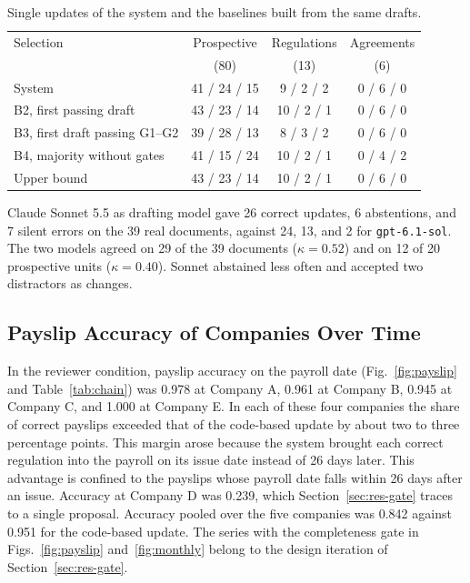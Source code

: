 \begin{table}[!t]
\caption{Single updates of the system and the baselines built from the same drafts.}
\label{tab:single}
\centering\footnotesize
\setlength{\tabcolsep}{3pt}
\begin{tabular}{@{}lccc@{}}
\toprule
Selection & Prospective & Regulations & Agreements \\
 & (80) & (13) & (6) \\
\midrule
System & 41 / 24 / 15 & 9 / 2 / 2 & 0 / 6 / 0 \\
B2, first passing draft & 43 / 23 / 14 & 10 / 2 / 1 & 0 / 6 / 0 \\
B3, first draft passing G1--G2 & 39 / 28 / 13 & 8 / 3 / 2 & 0 / 6 / 0 \\
B4, majority without gates & 41 / 15 / 24 & 10 / 2 / 1 & 0 / 4 / 2 \\
Upper bound & 43 / 23 / 14 & 10 / 2 / 1 & 0 / 6 / 0 \\
\bottomrule
\end{tabular}
\end{table}

Claude Sonnet 5.5 as drafting model gave 26 correct updates, 6 abstentions, and 7 silent errors on the 39 real documents, against 24, 13, and 2 for \texttt{gpt-6.1-sol}. The two models agreed on 29 of the 39 documents ($\kappa = 0.52$) and on 12 of 20 prospective units ($\kappa = 0.40$). Sonnet abstained less often and accepted two distractors as changes.

\subsection{Payslip Accuracy of Companies Over Time}
\label{sec:res-chain}
In the reviewer condition, payslip accuracy on the payroll date (Fig.~\ref{fig:payslip} and Table~\ref{tab:chain}) was 0.978 at Company A, 0.961 at Company B, 0.945 at Company C, and 1.000 at Company E. In each of these four companies the share of correct payslips exceeded that of the code-based update by about two to three percentage points. This margin arose because the system brought each correct regulation into the payroll on its issue date instead of 26 days later. This advantage is confined to the payslips whose payroll date falls within 26 days after an issue. Accuracy at Company D was 0.239, which Section~\ref{sec:res-gate} traces to a single proposal. Accuracy pooled over the five companies was 0.842 against 0.951 for the code-based update. The series with the completeness gate in Figs.~\ref{fig:payslip} and~\ref{fig:monthly} belong to the design iteration of Section~\ref{sec:res-gate}.

